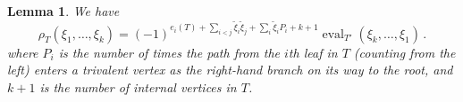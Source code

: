 \documentclass[english,letter paper,12pt,leqno]{article}
\newtheorem{lemma}[theorem]{Lemma}
\theoremstyle{example}
\numberwithin{equation}{section}
\def\be{\begin{equation}}
\def\ee{\end{equation}}
\begin{document}

\begin{lemma}\label{prop:replacer2} We have
\be\label{eq:proprhoT}
\rho_T( \xi_1, \ldots, \xi_k ) = (-1)^{e_i(T) + \sum_{i < j} \widetilde{\xi}_i \widetilde{\xi}_j + \sum_i \widetilde{\xi}_i P_i + k + 1} \operatorname{eval}_{T'}( \xi_k, \ldots, \xi_1 )\,.
\ee
where $P_i$ is the number of times the path from the $i$th leaf in $T$ (counting from the left) enters a trivalent vertex as the right-hand branch on its way to the root, and $k+1$ is the number of internal vertices in $T$.
\end{lemma}
\end{document}
